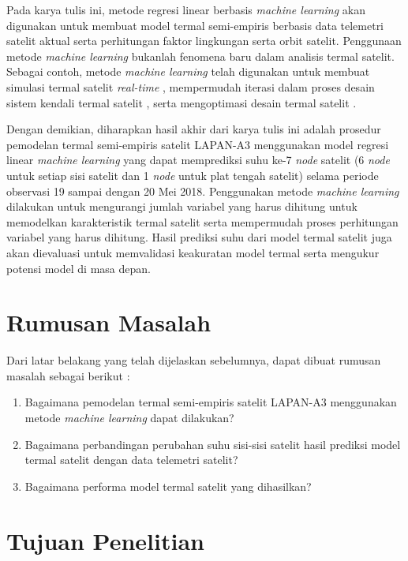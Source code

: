 Pada karya tulis ini, metode regresi linear berbasis \textit{machine learning} akan
digunakan untuk membuat model termal semi-empiris berbasis data telemetri
satelit aktual serta perhitungan faktor lingkungan serta orbit satelit.
Penggunaan metode \textit{machine learning} bukanlah fenomena baru dalam analisis termal
satelit. Sebagai contoh, metode \textit{machine learning} telah digunakan untuk membuat
simulasi termal satelit \textit{real-time} \cite{junior2017}, mempermudah
iterasi dalam proses desain sistem kendali termal satelit \cite{escobar2016},
serta mengoptimasi desain termal satelit \cite{xiong2020}.

Dengan demikian, diharapkan hasil akhir dari karya tulis ini adalah prosedur
pemodelan termal semi-empiris satelit LAPAN-A3 menggunakan model regresi linear
\textit{machine learning} yang dapat memprediksi suhu ke-7 \textit{node}
satelit (6 \textit{node} untuk setiap sisi satelit dan 1 \textit{node} untuk
plat tengah satelit) selama periode observasi 19 sampai dengan 20 Mei 2018.
Penggunakan metode \textit{machine learning} dilakukan untuk mengurangi jumlah
variabel yang harus dihitung untuk memodelkan karakteristik termal satelit
serta mempermudah proses perhitungan variabel yang harus dihitung. Hasil
prediksi suhu dari model termal satelit juga akan dievaluasi untuk memvalidasi
keakuratan model termal serta mengukur potensi model di masa depan.

\section{Rumusan Masalah}

Dari latar belakang yang telah dijelaskan sebelumnya, dapat dibuat rumusan masalah sebagai berikut :

\begin{enumerate}
\item Bagaimana pemodelan termal semi-empiris satelit LAPAN-A3 menggunakan metode \textit{machine learning} dapat dilakukan?
\item Bagaimana perbandingan perubahan suhu sisi-sisi satelit hasil prediksi model termal satelit dengan data telemetri satelit?
\item Bagaimana performa model termal satelit yang dihasilkan?
\end{enumerate}

\section{Tujuan Penelitian}

